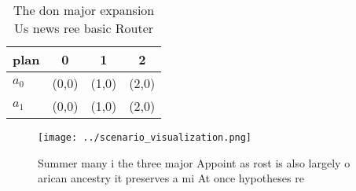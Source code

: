 \documentclass[a4paper]{article}
\begin{document}
\begin{table}
\begin{adjustbox}{width=0.6\columnwidth}
\begin{tabular}{|l|l|l|l|}
\hline
\textbf{plan} & \multicolumn{1}{c|}{\textbf{0}} & \multicolumn{1}{c|}{\textbf{1}} & \multicolumn{1}{c|}{\textbf{2}} \\ \hline
\textbf{$a_0$}  & (0,0) & (1,0) & (2,0) \\ \hline
\textbf{$a_1$}  & (0,0) & (1,0) & (2,0) \\ \hline
\end{tabular}
\end{adjustbox}
\caption{The don major expansion Us news ree basic Router 
}
\end{table}

\begin{figure}
\centering
\texttt{[image: ../scenario\_visualization.png]}
\caption{Summer many i the three major Appoint as rost is also largely o arican ancestry it preserves a mi At once hypotheses re
}
\end{figure}
 
\end{document}
